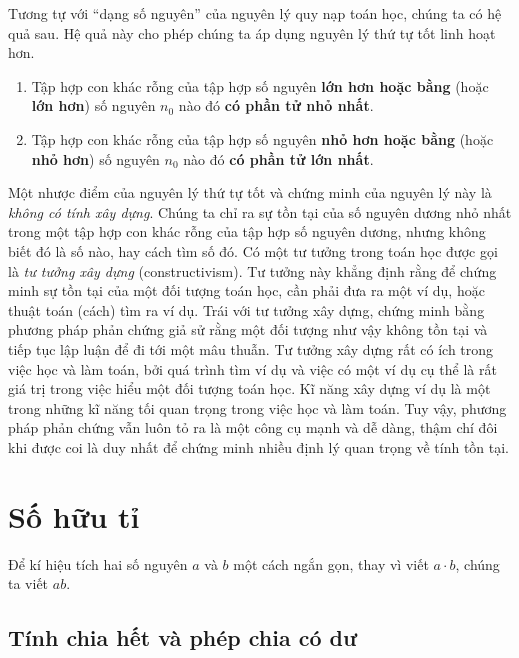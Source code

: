 Tương tự với ``dạng số nguyên'' của nguyên lý quy nạp toán học, chúng ta có hệ quả sau. Hệ quả này cho phép chúng ta áp dụng nguyên lý thứ tự tốt linh hoạt hơn.

\begin{corollary}
	\begin{enumerate}[label={(\roman*)}]
		\item Tập hợp con khác rỗng của tập hợp số nguyên \textbf{lớn hơn hoặc bằng} (hoặc \textbf{lớn hơn}) số nguyên $n_{0}$ nào đó \textbf{có phần tử nhỏ nhất}.
		\item Tập hợp con khác rỗng của tập hợp số nguyên \textbf{nhỏ hơn hoặc bằng} (hoặc \textbf{nhỏ hơn}) số nguyên $n_{0}$ nào đó \textbf{có phần tử lớn nhất}.
	\end{enumerate}
\end{corollary}

Một nhược điểm của nguyên lý thứ tự tốt và chứng minh của nguyên lý này là \textit{không có tính xây dựng}. Chúng ta chỉ ra sự tồn tại của số nguyên dương nhỏ nhất trong một tập hợp con khác rỗng của tập hợp số nguyên dương, nhưng không biết đó là số nào, hay cách tìm số đó. Có một tư tưởng trong toán học được gọi là \textit{tư tưởng xây dựng} (constructivism). Tư tưởng này khẳng định rằng để chứng minh sự tồn tại của một đối tượng toán học, cần phải đưa ra một ví dụ, hoặc thuật toán (cách) tìm ra ví dụ. Trái với tư tưởng xây dựng, chứng minh bằng phương pháp phản chứng giả sử rằng một đối tượng như vậy không tồn tại và tiếp tục lập luận để đi tới một mâu thuẫn. Tư tưởng xây dựng rất có ích trong việc học và làm toán, bởi quá trình tìm ví dụ và việc có một ví dụ cụ thể là rất giá trị trong việc hiểu một đối tượng toán học. Kĩ năng xây dựng ví dụ là một trong những kĩ năng tối quan trọng trong việc học và làm toán. Tuy vậy, phương pháp phản chứng vẫn luôn tỏ ra là một công cụ mạnh và dễ dàng, thậm chí đôi khi được coi là duy nhất để chứng minh nhiều định lý quan trọng về tính tồn tại.

\section{Số hữu tỉ}\label{section:rationals}

Để kí hiệu tích hai số nguyên $a$ và $b$ một cách ngắn gọn, thay vì viết $a\cdot b$, chúng ta viết $ab$.

\subsection*{Tính chia hết và phép chia có dư}

